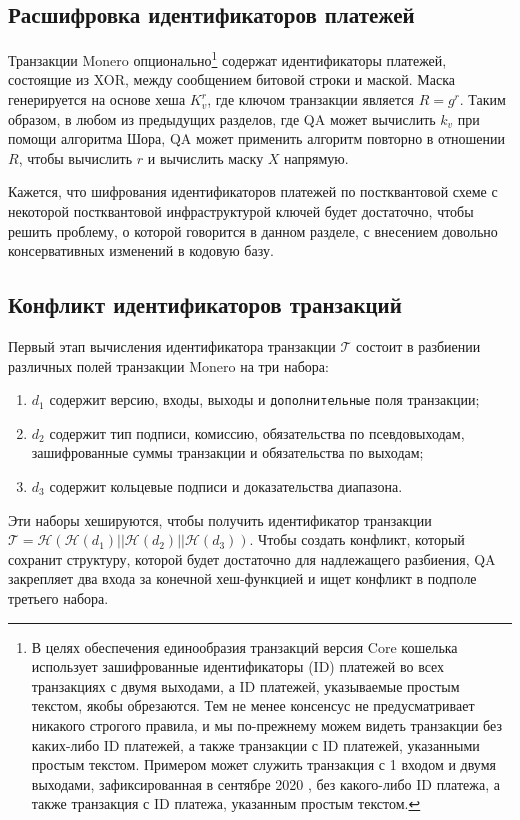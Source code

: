 \documentclass{mrl}
\begin{document}
\subsection{Расшифровка идентификаторов платежей}

Транзакции Monero опционально\footnote{В целях обеспечения единообразия транзакций версия Core кошелька использует зашифрованные идентификаторы (ID) платежей во всех транзакциях с двумя выходами, а ID платежей, указываемые простым текстом, якобы обрезаются. Тем не менее консенсус не предусматривает никакого строгого правила, и мы по-прежнему можем видеть транзакции без каких-либо ID платежей, а также транзакции с ID платежей, указанными простым текстом. Примером может служить транзакция с 1 входом и двумя выходами, зафиксированная в сентябре 2020 \cite{noPID}, без какого-либо ID платежа, а также транзакция \cite{uPID} с ID платежа, указанным простым текстом.}
содержат идентификаторы платежей, состоящие из XOR, между сообщением битовой строки и маской. Маска генерируется на основе хеша $K_v^r$, где ключом транзакции является $R = g^r$. Таким образом, в любом из предыдущих разделов, где QA может вычислить $k_v$ при помощи алгоритма Шора, QA может применить алгоритм повторно в отношении $R$, чтобы вычислить $r$ и вычислить маску $X$ напрямую. 

Кажется, что шифрования идентификаторов платежей по постквантовой схеме с некоторой постквантовой инфраструктурой ключей будет достаточно, чтобы решить проблему, о которой говорится в данном разделе, с внесением довольно консервативных изменений в кодовую базу.

\subsection{Конфликт идентификаторов транзакций}
Первый этап вычисления идентификатора транзакции $\mathcal{T}$ состоит в разбиении различных полей транзакции Monero на три набора: 
\begin{enumerate}
    \item $d_1$ содержит версию, входы, выходы и \texttt{дополнительные} поля транзакции;
    \item $d_2$ содержит тип подписи, комиссию, обязательства по псевдовыходам, зашифрованные суммы транзакции и обязательства по выходам;
    \item $d_3$ содержит кольцевые подписи и доказательства диапазона.
\end{enumerate}
Эти наборы хешируются, чтобы получить идентификатор транзакции $\mathcal{T} = \mathcal{H}(\mathcal{H}(d_1)||\mathcal{H}(d_2)||\mathcal{H}(d_3))$. Чтобы создать конфликт, который сохранит структуру, которой будет достаточно для надлежащего разбиения, QA закрепляет два входа за конечной хеш-функцией и ищет конфликт в подполе третьего набора.
\end{document}
